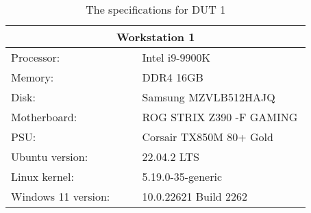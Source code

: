 \begin{table}[H]
    \centering
    \begin{tabular}{|| p{0.38\linewidth} | p{0.49\linewidth} ||}
    \hline
    \multicolumn{2}{||c||}{Workstation 1}           \\ [0.5ex] \hline\hline
    Processor:          & Intel i9-9900K \\
    Memory:             & DDR4 16GB                     \\
    Disk:               & Samsung MZVLB512HAJQ \\
    Motherboard:        & ROG STRIX Z390 -F GAMING      \\
    PSU:                & Corsair TX850M 80+ Gold\\
    Ubuntu version:     & 22.04.2 LTS        \\
    Linux kernel:       & 5.19.0-35-generic       \\
    Windows 11 version: & 10.0.22621 Build 2262 \\ \hline
    \end{tabular}
    \caption{The specifications for DUT 1}
    \label{tab:DUT1}
\end{table}